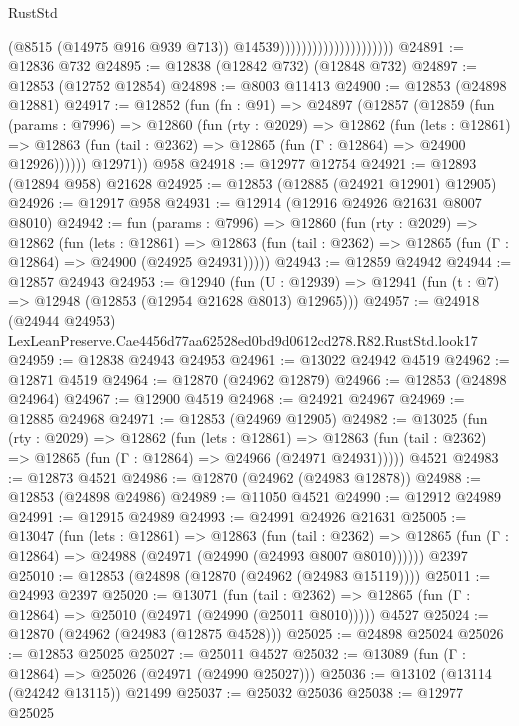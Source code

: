 \begin{lexlean}{RustStd}
\begin{coremodule}
                                              (@8515 (@14975 @916 @939 @713))
                                              @14539)))))))))))))))))))))
@24891 := @12836 @732
@24895 := @12838 (@12842 @732) (@12848 @732)
@24897 := @12853 (@12752 @12854)
@24898 := @8003 @11413
@24900 := @12853 (@24898 @12881)
@24917 := @12852
    (fun (fn : @91) =>
    @24897
      (@12857
        (@12859
          (fun (params : @7996) =>
          @12860
            (fun (rty : @2029) =>
            @12862
              (fun (lets : @12861) =>
              @12863 (fun (tail : @2362) => @12865 (fun (Γ : @12864) => @24900 @12926))))))
        @12971))
    @958
@24918 := @12977 @12754
@24921 := @12893 (@12894 @958) @21628
@24925 := @12853 (@12885 (@24921 @12901) @12905)
@24926 := @12917 @958
@24931 := @12914 (@12916 @24926 @21631 @8007 @8010)
@24942 := fun (params : @7996) =>
  @12860
    (fun (rty : @2029) =>
    @12862
      (fun (lets : @12861) =>
      @12863 (fun (tail : @2362) => @12865 (fun (Γ : @12864) => @24900 (@24925 @24931)))))
@24943 := @12859 @24942
@24944 := @12857 @24943
@24953 := @12940
    (fun (U : @12939) => @12941 (fun (t : @7) => @12948 (@12853 (@12954 @21628 @8013) @12965)))
@24957 := @24918
    (@24944 @24953)
    LexLeanPreserve.Cae4456d77aa62528ed0bd9d0612cd278.R82.RustStd.look17
@24959 := @12838 @24943 @24953
@24961 := @13022 @24942 @4519
@24962 := @12871 @4519
@24964 := @12870 (@24962 @12879)
@24966 := @12853 (@24898 @24964)
@24967 := @12900 @4519
@24968 := @24921 @24967
@24969 := @12885 @24968
@24971 := @12853 (@24969 @12905)
@24982 := @13025
    (fun (rty : @2029) =>
    @12862
      (fun (lets : @12861) =>
      @12863 (fun (tail : @2362) => @12865 (fun (Γ : @12864) => @24966 (@24971 @24931)))))
    @4521
@24983 := @12873 @4521
@24986 := @12870 (@24962 (@24983 @12878))
@24988 := @12853 (@24898 @24986)
@24989 := @11050 @4521
@24990 := @12912 @24989
@24991 := @12915 @24989
@24993 := @24991 @24926 @21631
@25005 := @13047
    (fun (lets : @12861) =>
    @12863
      (fun (tail : @2362) =>
      @12865 (fun (Γ : @12864) => @24988 (@24971 (@24990 (@24993 @8007 @8010))))))
    @2397
@25010 := @12853 (@24898 (@12870 (@24962 (@24983 @15119))))
@25011 := @24993 @2397
@25020 := @13071
    (fun (tail : @2362) => @12865 (fun (Γ : @12864) => @25010 (@24971 (@24990 (@25011 @8010)))))
    @4527
@25024 := @12870 (@24962 (@24983 (@12875 @4528)))
@25025 := @24898 @25024
@25026 := @12853 @25025
@25027 := @25011 @4527
@25032 := @13089 (fun (Γ : @12864) => @25026 (@24971 (@24990 @25027)))
@25036 := @13102 (@13114 (@24242 @13115)) @21499
@25037 := @25032 @25036
@25038 := @12977 @25025

\end{coremodule}
\end{lexlean}
